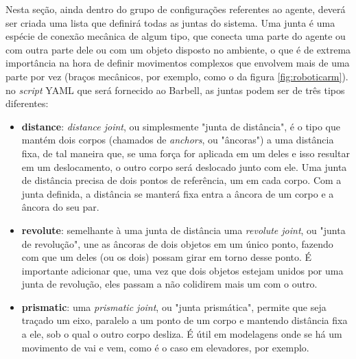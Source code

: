 \documentclass[cic,tc]{iiufrgs}
\begin{document}
    Nesta seção, ainda dentro do grupo de configurações referentes ao agente, deverá ser criada uma lista que definirá todas as juntas do sistema. Uma junta
    é uma espécie de conexão mecânica de algum tipo, que conecta uma parte do agente ou com outra parte dele ou com um objeto disposto no ambiente, o que é
    de extrema importância na hora de definir movimentos complexos que envolvem mais de uma parte por vez (braços mecânicos, por exemplo, como o da figura \ref{fig:roboticarm}).
    no \textit{script} YAML que será fornecido ao Barbell, as juntas podem ser de três tipos diferentes:
    \begin{itemize}
      \item \textbf{distance}: \textit{distance joint}, ou simplesmente "junta de distância", é o tipo que mantém dois corpos (chamados de \textit{anchors}, ou "âncoras") a uma distância fixa, de tal maneira que, se uma força for aplicada em um deles e isso resultar em um deslocamento,
      o outro corpo será deslocado junto com ele. Uma junta de distância precisa de dois pontos de referência, um em cada corpo.
      Com a junta definida, a distância se manterá fixa entra a âncora de um corpo e a âncora do seu par.
      \item \textbf{revolute}: semelhante à uma junta de distância uma \textit{revolute joint}, ou "junta de revolução", une as âncoras de dois objetos em um
      único ponto, fazendo com que um deles (ou os dois) possam girar em torno desse ponto. É importante adicionar que, uma vez que dois objetos estejam
      unidos por uma junta de revolução, eles passam a não colidirem mais um com o outro.
      \item \textbf{prismatic}: uma \textit{prismatic joint}, ou "junta prismática", permite que seja traçado um eixo, paralelo a um ponto de um corpo e
      mantendo distância fixa a ele, sob o qual o outro corpo desliza. É útil em modelagens onde se há um movimento de vai e vem, como é o caso em elevadores,
      por exemplo.
    \end{itemize}
    
\end{document}
